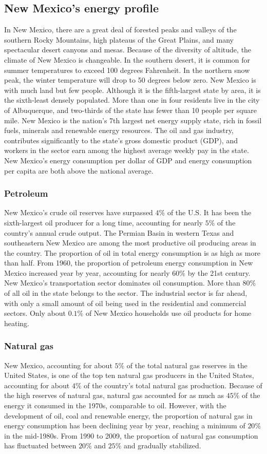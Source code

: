 \documentclass{mcmthesis}
\begin{document}
\subsection{New Mexico's energy profile}
In New Mexico, there are a great deal of forested peaks and valleys of the southern Rocky Mountains, high plateaus of the Great Plains, and many spectacular desert canyons and mesas. Because of the diversity of altitude, the climate of New Mexico is changeable. In the southern desert, it is common for summer temperatures to exceed 100 degrees Fahrenheit. In the northern snow peak, the winter temperature will drop to 50 degrees below zero. New Mexico is with much land but few people. Although it is the fifth-largest state by area, it is the sixth-least densely populated. More than one in four residents live in the city of Albuquerque, and two-thirds of the state has fewer than 10 people per square mile. New Mexico is the nation's 7th largest net energy supply state, rich in fossil fuels, minerals and renewable energy resources. The oil and gas industry, contributes significantly to the state's gross domestic product (GDP), and workers in the sector earn among the highest average weekly pay in the state. New Mexico's energy consumption per dollar of GDP and energy consumption per capita are both above the national average.
\subsubsection{Petroleum}
  New Mexico's crude oil reserves have surpassed $4\%$ of the U.S. It has been the sixth-largest oil producer for a long time, accounting
  for nearly $5\%$ of the country's annual crude output. The Permian Basin in western Texas and southeastern New Mexico are among
  the most productive oil producing areas in the country. The proportion of oil in total energy consumption is as high as more than half.
  From 1960, the proportion of petroleum energy consumption in New Mexico increased year by year, accounting for nearly $60\%$ by the 21st century.
  New Mexico's transportation sector dominates oil consumption. More than $80\%$ of all oil in the state belongs to the sector.
  The industrial sector is far ahead, with only a small amount of oil being used in the residential and commercial sectors.
  Only about $0.1\%$ of New Mexico households use oil products for home heating.
\subsubsection{Natural gas}
  New Mexico, accounting for about $5\%$ of the total natural gas reserves in the United States, is one of the top ten natural gas
  producers in the United States, accounting for about $4\%$ of the country's total natural gas production. Because of the high reserves of
  natural gas, natural gas accounted for as much as $45\%$ of the energy it consumed in the 1970s, comparable to oil.
  However, with the development of oil, coal and renewable energy, the proportion of natural gas in energy consumption has been declining year by year,
  reaching a minimum of $20\%$ in the mid-1980s. From 1990 to 2009, the proportion of natural gas consumption has fluctuated between $20\%$ and $25\%$
   and gradually stabilized.
\end{document}
